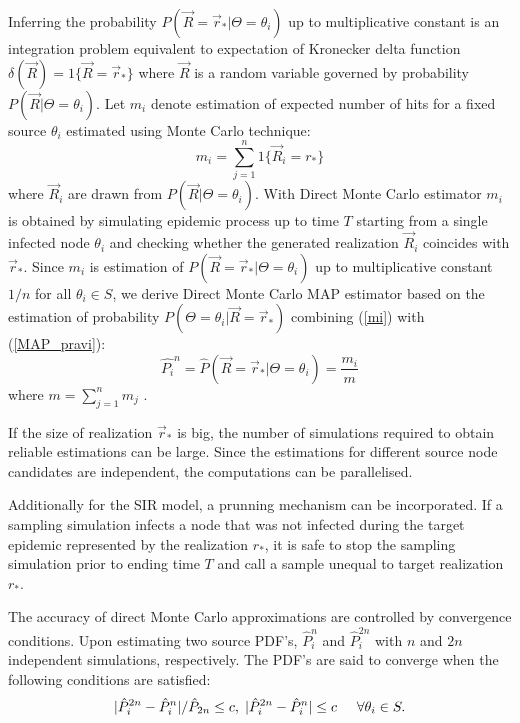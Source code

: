\documentclass[times, utf8, diplomski]{fer}
\begin{document}
Inferring the probability  $P(\vec R = \vec r_* | \Theta = \theta_i)$ up to multiplicative constant is an integration problem equivalent to expectation of Kronecker delta function
 $\delta(\vec R) = 1\{\vec R = \vec r_{*}\}$ where $\vec R$ is a random variable governed by probability $P(\vec R  | \Theta = \theta_i)$. 
 Let $m_i$ denote estimation of expected number of hits for a fixed source $\theta_i$ estimated using Monte Carlo technique:
\begin{equation}
 m_i = \sum_{j = 1}^{n} 1\{\vec R_i = r_{*}\}
\label{mi}
\end{equation}
where $\vec R_i$ are drawn from $P(\vec R | \Theta = \theta_i)$. With Direct Monte Carlo estimator $m_i$ is obtained by simulating epidemic process up to time $T$ starting from a single infected node $\theta_i$ and checking whether the generated realization $\vec R_i$ coincides with $\vec r_*$. Since $m_i$ is estimation of $P(\vec R = \vec r_* | \Theta = \theta_i)$ up to multiplicative constant $1/n$ for all $\theta_i \in S$, we derive Direct Monte Carlo MAP estimator based on the estimation of probability $P(\Theta = \theta_i | \vec R = \vec r_*)$ combining (\ref{mi}) with (\ref{MAP_pravi}): 
\begin{equation}
\hat{P_i}^n = \hat{P}(\vec R = \vec r_* | \Theta = \theta_i) = \frac{m_i}{m}
\end{equation}
where $m = \sum_{j = 1}^{n} m_j$ .

If the size of realization $\vec r_*$ is big, the number of simulations required to obtain reliable estimations can be large. Since the estimations for different source node candidates are independent, the computations can be parallelised.  

Additionally for the SIR model, a prunning mechanism can be incorporated. If a sampling simulation infects a node that was not infected during the target epidemic  represented by the realization $r_*$, it is safe to stop the sampling simulation prior to ending time $T$ and call a sample unequal to target realization $r_*$.

The accuracy of direct Monte Carlo approximations are controlled by convergence conditions. Upon estimating two source PDF's, $\hat{P}_i^n$ and $\hat{P}_i^{2n}$ with $n$ and $2n$ independent simulations, respectively. The PDF's are said to converge when the following conditions are satisfied:
\begin{equation}
| \hat{P}_i^{2n} - \hat{P}_i^{n} | / \hat{P}_{2n} \leq c, \hspace{1mm} | \hat{P}_i^{2n} - \hat{P}_i^{n} | \leq c \hspace{5mm} \forall \theta_i \in S.
\label{DMCConv}
\end{equation}
\end{document}
